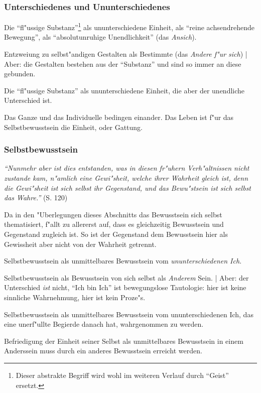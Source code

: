 \documentclass[emulatestandardclasses]{scrartcl}
\begin{document}
\subsubsection{Unterschiedenes und Ununterschiedenes}\label{sec:leben}

\begin{description}[leftmargin=!,labelwidth=\widthof{\bfseries Neg. d. Neg.}]
  \item[Meinen] Die "`fl"ussige Substanz"'\footnote{Dieser abstrakte Begriff wird wohl im weiteren Verlauf durch "`Geist"' ersetzt.} als ununterschiedene Einheit, als "`reine achsendrehende Bewegung"', als "`absolutunruhige Unendlichkeit"' (das \emph{Ansich}).
  \item[Negation] Entzweiung zu selbst"andigen Gestalten als Bestimmte  (das \emph{Andere f"ur sich}) | Aber: die Gestalten bestehen aus der "`Substanz"' und sind so immer an diese gebunden.
  \item[Neg. d. Neg.] Die "`fl"ussige Substanz"' als ununterschiedene Einheit, die aber der unendliche Unterschied ist.
  \item[Erkenntnis] Das Ganze und das Individuelle bedingen einander. Das Leben ist f"ur das Selbstbewusstsein die Einheit, oder Gattung.
\end{description}

\subsubsection{Selbstbewusstsein}

\emph{"`Nunmehr aber ist dies entstanden, was in diesen fr"uhern Verh"altnissen nicht zustande kam, n"amlich eine Gewi"sheit, welche ihrer Wahrheit gleich ist, denn die Gewi"sheit ist sich selbst ihr Gegenstand, und das Bewu"stsein ist sich selbst das Wahre."'} (S. 120)


Da in den "Uberlegungen dieses Abschnitts das Bewusstsein sich selbst thematisiert, f"allt zu allererst auf, dass es gleichzeitig Bewusstsein und Gegenstand zugleich ist. So ist der Gegenstand dem Bewusstsein hier als Gewissheit aber nicht von der Wahrheit getrennt.

\begin{description}[leftmargin=!,labelwidth=\widthof{\bfseries Neg. d. Neg.}]
  \item[Meinen] Selbstbewusstsein als unmittelbares Bewusstsein vom \emph{ununterschiedenen Ich}.
  \item[Negation] Selbstbewusstsein als Bewusstsein von sich selbst als \emph{Anderem} Sein. | Aber: der Unterschied \emph{ist} nicht, "`Ich bin Ich"' ist bewegungslose Tautologie: hier ist keine sinnliche Wahrnehmung, hier ist kein Proze"s.
  \item[Neg. d. Neg.] Selbstbewusstsein als unmittelbares Bewusstsein vom ununterschiedenen Ich, das eine unerf"ullte Begierde danach hat, wahrgenommen zu werden.
  \item[Erkenntnis] Befriedigung der Einheit seiner Selbst als unmittelbares Bewusstsein in einem Anderssein muss durch ein anderes Bewusstsein erreicht werden.
\end{description}
\end{document}
